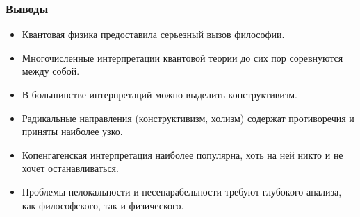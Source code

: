 \documentclass[10pt]{beamer}
\begin{document}
\begin{frame}[label=conclusions]%
  \frametitle{Выводы}

  \begin{itemize}
    \item Квантовая физика предоставила серьезный вызов философии.
    \item Многочисленные интерпретации квантовой теории до сих пор 
      соревнуются между собой.
    \item В большинстве интерпретаций можно выделить конструктивизм.
    \item Радикальные направления (конструктивизм, холизм) содержат 
      противоречия и приняты наиболее узко.
    \item Копенгагенская интерпретация наиболее популярна, хоть на ней 
      никто и не хочет останавливаться.
    \item Проблемы нелокальности и несепарабельности требуют глубокого 
      анализа, как философского, так и физического.
  \end{itemize}
\end{frame}%
\end{document}

